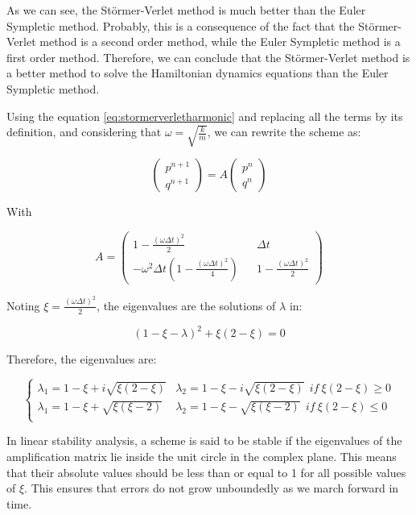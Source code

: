 \documentclass{article}
\begin{document}
As we can see, the Störmer-Verlet method is much better than the Euler Sympletic method. Probably, this is a consequence of the fact that the Störmer-Verlet method is a second order method, while the Euler Sympletic method is a first order method. Therefore, we can conclude that the Störmer-Verlet method is a better method to solve the Hamiltonian dynamics equations than the Euler Sympletic method.

\label{sec:linear_stability_verlet}

Using the equation \ref{eq:stormerverletharmonic} and replacing all the terms by its definition, and considering that \(\omega = \sqrt{\frac{k}{m}}\), we can rewrite the scheme as:

\[
	\begin{pmatrix} p^{n+1} \\ q^{n+1} \end{pmatrix} = A \begin{pmatrix} p^{n} \\ q^{n} \end{pmatrix}
\]

With

\[
	A = \begin{pmatrix}
		1 - \frac{(\omega \Delta t)^2}{2} && \Delta t \\
		-\omega^2 \Delta t (1 - \frac{(\omega \Delta t)^2}{4}) && 1 - \frac{(\omega \Delta t)^2}{2}
	\end{pmatrix}
\]

Noting \(\xi = \frac{(\omega \Delta t)^2}{2}\), the eigenvalues are the solutions of $\lambda$ in:

\[
	(1 - \xi - \lambda)^2 + \xi (2 - \xi) = 0
\]

Therefore, the eigenvalues are:

\[
	\begin{cases}
		\lambda_1 = 1 - \xi + i\sqrt{\xi(2-\xi)} &
		\lambda_2 = 1 - \xi - i\sqrt{\xi(2-\xi)} \ \ if \ \xi(2-\xi) \geq 0 \\

		\lambda_1 = 1 - \xi + \sqrt{\xi(\xi - 2)} &
		\lambda_2 = 1 - \xi - \sqrt{\xi(\xi - 2)} \ \ if \ \xi(2-\xi) \leq 0 \\
	\end{cases}
\]

In linear stability analysis, a scheme is said to be stable if the eigenvalues of the amplification matrix lie inside the unit circle in the complex plane. This means that their absolute values should be less than or equal to 1 for all possible values of \( \xi \). This ensures that errors do not grow unboundedly as we march forward in time.
\end{document}
